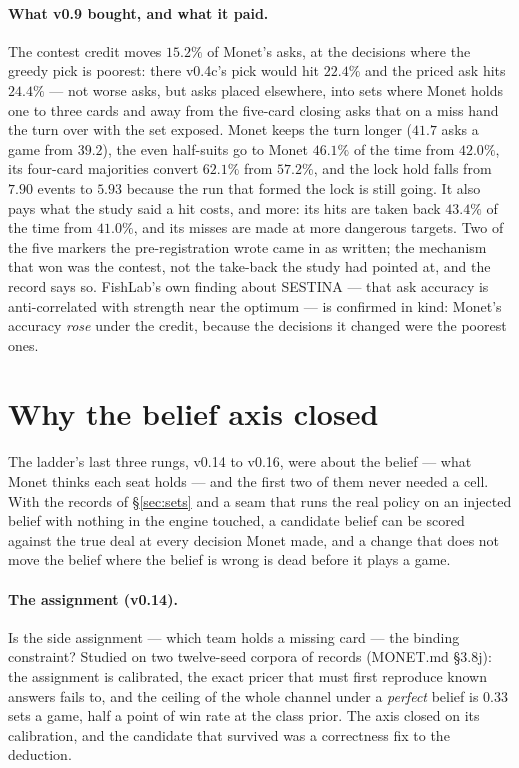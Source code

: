 \documentclass[11pt]{article}
\newcommand{\monet}{MONET.md}
\begin{document}
\paragraph{What v0.9 bought, and what it paid.} The contest credit moves $15.2\%$ of Monet's asks,
at the decisions where the greedy pick is poorest: there v0.4c's pick would hit $22.4\%$ and the
priced ask hits $24.4\%$ --- not worse asks, but asks placed elsewhere, into sets where Monet holds
one to three cards and away from the five-card closing asks that on a miss hand the turn over with
the set exposed. Monet keeps the turn longer ($41.7$ asks a game from $39.2$), the even half-suits
go to Monet $46.1\%$ of the time from $42.0\%$, its four-card majorities convert $62.1\%$ from
$57.2\%$, and the lock hold falls from $7.90$ events to $5.93$ because the run that formed the lock
is still going. It also pays what the study said a hit costs, and more: its hits are taken back
$43.4\%$ of the time from $41.0\%$, and its misses are made at more dangerous targets. Two of the
five markers the pre-registration wrote came in as written; the mechanism that won was the contest,
not the take-back the study had pointed at, and the record says so. FishLab's own finding about
SESTINA --- that ask accuracy is anti-correlated with strength near the optimum \cite{fishlab} ---
is confirmed in kind: Monet's accuracy \emph{rose} under the credit, because the decisions it changed
were the poorest ones.

\section{Why the belief axis closed}
\label{sec:belief}

The ladder's last three rungs, v0.14 to v0.16, were about the belief --- what Monet thinks each
seat holds --- and the first two of them never needed a cell. With the records of \S\ref{sec:sets}
and a seam that runs the real
policy on an injected belief with nothing in the engine touched, a candidate belief can be scored
against the true deal at every decision Monet made, and a change that does not move the belief where
the belief is wrong is dead before it plays a game.

\paragraph{The assignment (v0.14).} Is the side assignment --- which team holds a missing card ---
the binding constraint? Studied on two twelve-seed corpora of records (\monet{}
\S3.8j): the assignment is calibrated, the exact pricer that must first reproduce known answers
fails to, and the ceiling of the whole channel under a \emph{perfect} belief is $0.33$ sets a game,
half a point of win rate at the class prior. The axis closed on its calibration, and the candidate
that survived was a correctness fix to the deduction.
\end{document}
